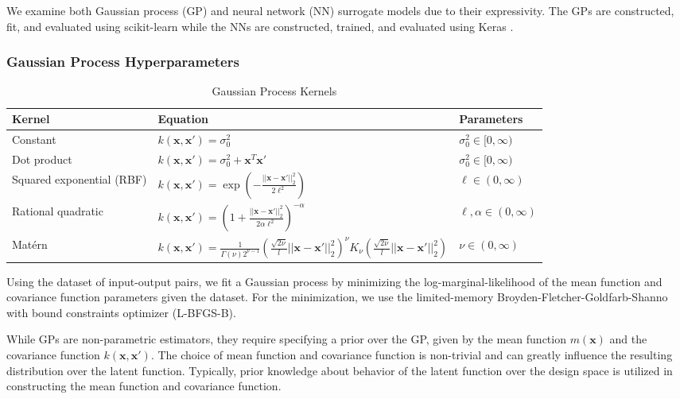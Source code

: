 \documentclass[conference]{IEEEtran}
\begin{document}
	We examine both Gaussian process (GP) and neural network (NN) surrogate models due to their expressivity. The GPs are constructed, fit, and evaluated using scikit-learn \cite{Scikit-learn:Python} while the NNs are constructed, trained, and evaluated using Keras \cite{Keras:API}.
	
	\subsubsection{Gaussian Process Hyperparameters}
	
	\begin{table*}[htbp]
    \renewcommand{\arraystretch}{2.2}
    \centering
    \caption{Gaussian Process Kernels}
    \label{tab:gp_kernels}
        \begin{tabular}{lll}
        \toprule 
        \bfseries Kernel & \bfseries Equation & \bfseries Parameters \\ \midrule
	    Constant &  $k(\mathbf{x}, \mathbf{x}') = \sigma_0^2$ & $\sigma_0^2 \in [0, \infty)$ \\
	    Dot product & $k(\mathbf{x}, \mathbf{x}') = \sigma_0^2 + \mathbf{x}^T \mathbf{x}'$ & $\sigma_0^2 \in [0, \infty)$ \\
	    Squared exponential (RBF) & $k(\mathbf{x}, \mathbf{x}') = \exp \left( -\frac{||\mathbf{x} - \mathbf{x}'||_2^2}{2\ell^2} \right)$ & $\ell \in (0, \infty)$ \\
	    Rational quadratic & $k(\mathbf{x}, \mathbf{x}') = \left(1+\frac{||\mathbf{x} - \mathbf{x}'||_2^2}{2\alpha \ell^2}\right)^{-\alpha}$ & $\ell, \alpha \in (0, \infty)$ \\
	    Mat\'ern & $k(\mathbf{x}, \mathbf{x}') = \frac{1}{\Gamma(\nu)2^{\nu-1}}\left(\frac{\sqrt{2\nu}}{l} ||\mathbf{x} - \mathbf{x}'||_2^2 \right)^\nu K_\nu\left(\frac{\sqrt{2\nu}}{l} ||\mathbf{x} - \mathbf{x}'||_2^2 \right)$ & $\nu \in (0, \infty)$ \\ \bottomrule
	    \end{tabular}
	\end{table*}
	
	Using the dataset of input-output pairs, we fit a Gaussian process by minimizing the log-marginal-likelihood of the mean function and covariance function parameters given the dataset. For the minimization, we use the limited-memory Broyden-Fletcher-Goldfarb-Shanno with bound constraints optimizer (\textsc{L-BFGS-B}).
	
	While GPs are non-parametric estimators, they require specifying a prior over the GP, given by the mean function $m(\boldsymbol{x})$ and the covariance function $k(\boldsymbol{x}, \boldsymbol{x}')$. The choice of mean function and covariance function is non-trivial and can greatly influence the resulting distribution over the latent function. Typically, prior knowledge about behavior of the latent function over the design space is utilized in constructing the mean function and covariance function.
	
\end{document}
